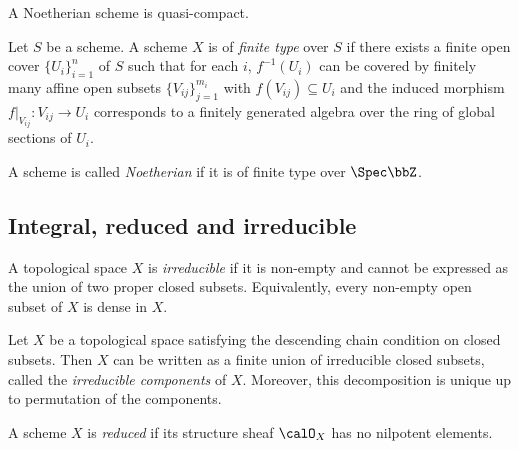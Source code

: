     \begin{proposition}\label{prop:noetherian_scheme_is_quasi_compact}
        A Noetherian scheme is quasi-compact.
    \end{proposition}

    \begin{definition}\label{def:scheme_of_finite_type_over_base_scheme}
        Let \(S\) be a scheme.
        A scheme \(X\) is of \emph{finite type} over \(S\) if there exists a finite open cover \(\{U_i\}_{i=1}^n\) of \(S\) such that for each \(i\), \(f^{-1}(U_i)\) can be covered by finitely many affine open subsets \(\{V_{ij}\}_{j=1}^{m_i}\) with \(f(V_{ij}) \subseteq U_i\) and the induced morphism \(f|_{V_{ij}} : V_{ij} \to U_i\) corresponds to a finitely generated algebra over the ring of global sections of \(U_i\).

        A scheme is called \emph{Noetherian} if it is of finite type over \(\Spec \bbZ\).
    \end{definition}


\subsection{Integral, reduced and irreducible}

    \begin{definition}\label{def:irreducible_topological_space}
        A topological space \(X\) is \emph{irreducible} if it is non-empty and cannot be expressed as the union of two proper closed subsets.
        Equivalently, every non-empty open subset of \(X\) is dense in \(X\).
    \end{definition}

    \begin{proposition}\label{prop:irreducible_components_and_primary_decomposition}
        Let \(X\) be a topological space satisfying the descending chain condition on closed subsets.
        Then \(X\) can be written as a finite union of irreducible closed subsets, called the \emph{irreducible components} of \(X\).
        Moreover, this decomposition is unique up to permutation of the components.
    \end{proposition}

    \begin{definition}\label{def:reduced_scheme}
        A scheme \(X\) is \emph{reduced} if its structure sheaf \(\calO_X\) has no nilpotent elements.
    \end{definition}

